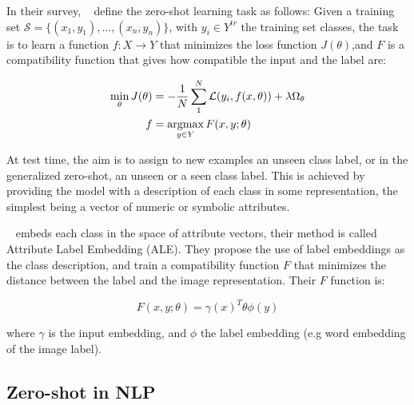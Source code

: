 In their survey, ~\citet{xian2017zero} define the zero-shot learning task as follows: Given a training set $\mathcal{S} = \{(x_1, y_1), \dots, (x_n, y_n)\}$, with $y_i \in Y^{tr}$ the training set classes, the task is to learn a function $f: X \rightarrow Y$ that minimizes the loss function $J(\theta)$,and $F$ is a compatibility function that gives how compatible the input and the label are: 

\begin{equation}
\begin{split}
    \min_{\theta} J(\theta) & = - \frac{1}{N} \sum_{1}^{N} \mathcal{L}(y_i, f(x, \theta)) + \lambda \Omega_\theta \\
    f & = \operatorname*{argmax}_{y \in Y} F(x, y; \theta)
\end{split}
\end{equation}

At test time, the aim is to assign to new examples an unseen class label, or in the generalized zero-shot, an unseen or a seen class label. This is achieved by providing the model with a description of each class in some representation, the simplest being a vector of numeric or symbolic attributes.

~\cite{akata2015ale} embeds each class in the space of attribute vectors, their method is called Attribute Label Embedding (ALE). They propose the use of label embeddings as the class description, and train a compatibility function $F$ that minimizes the distance between the label and the image representation. Their $F$ function is:

\begin{equation}
F(x, y ; \theta)=\gamma(x)^{T} \theta \phi(y)
\end{equation}

where $\gamma$ is the input embedding, and $\phi$ the label embedding (e.g word embedding of the image label). 

\subsection{Zero-shot in NLP}
